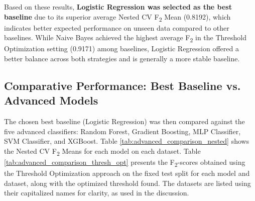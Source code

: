 \documentclass{article}
\begin{document}
Based on these results, \textbf{Logistic Regression was selected as the best baseline} due to its superior average Nested CV F\textsubscript{2} Mean (0.8192), which indicates better expected performance on unseen data compared to other baselines. While Naive Bayes achieved the highest average F\textsubscript{2} in the Threshold Optimization setting (0.9171) among baselines, Logistic Regression offered a better balance across both strategies and is generally a more stable baseline.

\subsection{Comparative Performance: Best Baseline vs. Advanced Models}
\label{sec:comparative_performance}

The chosen best baseline (Logistic Regression) was then compared against the five advanced classifiers: Random Forest, Gradient Boosting, MLP Classifier, SVM Classifier, and XGBoost. Table \ref{tab:advanced_comparison_nested} shows the Nested CV F\textsubscript{2} Means for each model on each dataset. Table \ref{tab:advanced_comparison_thresh_opt} presents the F\textsubscript{2}-scores obtained using the Threshold Optimization approach on the fixed test split for each model and dataset, along with the optimized threshold found. The datasets are listed using their capitalized names for clarity, as used in the discussion.
\end{document}
